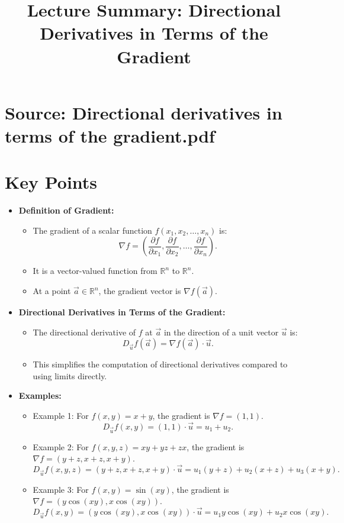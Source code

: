 \documentclass{article}
\title{Lecture Summary: Directional Derivatives in Terms of the Gradient}
\author{}
\date{}
\begin{document}
\maketitle

\section*{Source: Directional derivatives in terms of the gradient.pdf}

\section*{Key Points}

\begin{itemize}
  \item \textbf{Definition of Gradient:}
    \begin{itemize}
      \item The gradient of a scalar function $f(x_1, x_2, \dots, x_n)$ is:
        \[
          \nabla f = \left( \frac{\partial f}{\partial x_1}, \frac{\partial f}{\partial x_2}, \dots, \frac{\partial f}{\partial x_n} \right).
        \]
      \item It is a vector-valued function from $\mathbb{R}^n$ to $\mathbb{R}^n$.
      \item At a point $\vec{a} \in \mathbb{R}^n$, the gradient vector is $\nabla f(\vec{a})$.
    \end{itemize}

  \item \textbf{Directional Derivatives in Terms of the Gradient:}
    \begin{itemize}
      \item The directional derivative of $f$ at $\vec{a}$ in the direction of a unit vector $\vec{u}$ is:
        \[
          D_{\vec{u}} f(\vec{a}) = \nabla f(\vec{a}) \cdot \vec{u}.
        \]
      \item This simplifies the computation of directional derivatives compared to using limits directly.
    \end{itemize}

  \item \textbf{Examples:}
    \begin{itemize}
      \item Example 1: For $f(x, y) = x + y$, the gradient is $\nabla f = (1, 1)$.
        \[
          D_{\vec{u}} f(x, y) = (1, 1) \cdot \vec{u} = u_1 + u_2.
        \]
      \item Example 2: For $f(x, y, z) = xy + yz + zx$, the gradient is $\nabla f = (y + z, x + z, x + y)$.
        \[
          D_{\vec{u}} f(x, y, z) = (y + z, x + z, x + y) \cdot \vec{u} = u_1(y + z) + u_2(x + z) + u_3(x + y).
        \]
      \item Example 3: For $f(x, y) = \sin(xy)$, the gradient is $\nabla f = (y\cos(xy), x\cos(xy))$.
        \[
          D_{\vec{u}} f(x, y) = (y\cos(xy), x\cos(xy)) \cdot \vec{u} = u_1 y \cos(xy) + u_2 x \cos(xy).
        \]
    \end{itemize}


\end{itemize}
\end{document}
